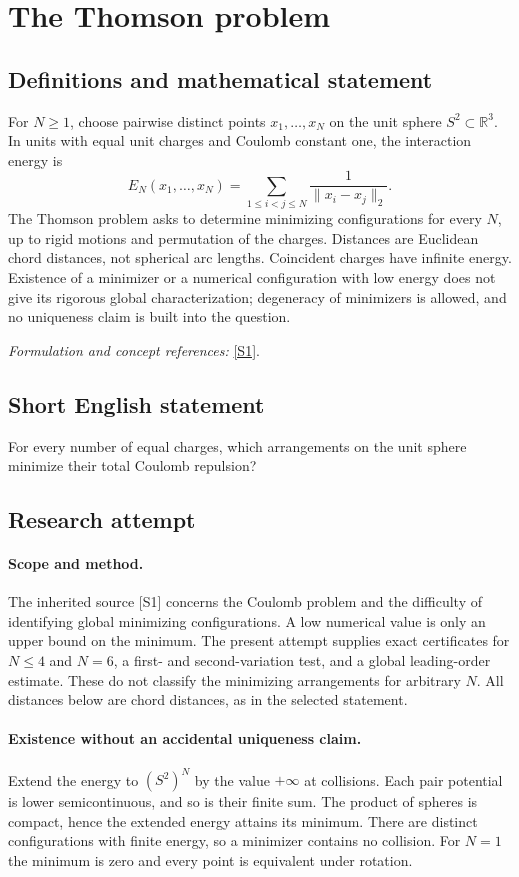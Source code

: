 \documentclass[11pt]{article}
\begin{document}
\section*{\texorpdfstring{The Thomson problem}{The Thomson problem}}\label{7200088}
\subsection{Definitions and mathematical statement}
For $N\ge1$, choose pairwise distinct points $x_1,\ldots,x_N$ on the unit sphere $S^2\subset{\mathbb{R}}^3$. In units with equal unit charges and Coulomb constant one, the interaction energy is
\[
 E_N(x_1,\ldots,x_N)=\sum_{1\le i<j\le N}\frac1{\|x_i-x_j\|_2}.
\]
The Thomson problem asks to determine minimizing configurations for every $N$, up to rigid motions and permutation of the charges. Distances are Euclidean chord distances, not spherical arc lengths. Coincident charges have infinite energy. Existence of a minimizer or a numerical configuration with low energy does not give its rigorous global characterization; degeneracy of minimizers is allowed, and no uniqueness claim is built into the question.
\par\smallskip\textit{Formulation and concept references:} \href{https://web.cels.anl.gov/~zippy/publications/thomson/thomsonPRL.html}{[S1]}.

\subsection{Short English statement}
For every number of equal charges, which arrangements on the unit sphere minimize their total Coulomb repulsion?
\subsection{Research attempt}
\paragraph{Scope and method.}
The inherited source [S1] concerns the Coulomb problem and the
difficulty of identifying global minimizing configurations. A low
numerical value is only an upper bound on the minimum. The present
attempt supplies exact certificates for $N\leq4$ and $N=6$, a
first- and second-variation test, and a global leading-order estimate.
These do not classify the minimizing arrangements for arbitrary $N$.
All distances below are chord distances, as in the selected statement.

\paragraph{Existence without an accidental uniqueness claim.}
Extend the energy to $(S^2)^N$ by the value $+\infty$ at collisions.
Each pair potential is lower semicontinuous, and so is their finite
sum. The product of spheres is compact, hence the extended energy
attains its minimum. There are distinct configurations with finite
energy, so a minimizer contains no collision. For $N=1$ the minimum
is zero and every point is equivalent under rotation.
\end{document}
